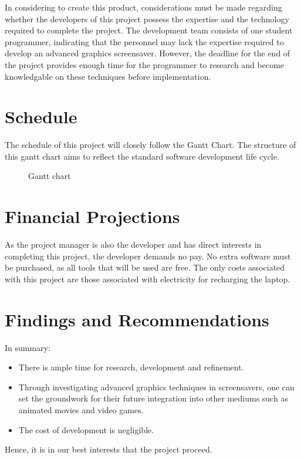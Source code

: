 \documentclass[10pt, openany]{book}
\begin{document}
In considering to create this product, considerations must be made regarding whether the developers of this project possess the expertise and the technology required to complete the project. The development team consists of one student programmer, indicating that the personnel may lack the expertise required to develop an advanced graphics screensaver. However, the deadline for the end of the project provides enough time for the programmer to research and become knowledgable on these techniques before implementation.

\section{Schedule}

The schedule of this project will closely follow the Gantt Chart.
The structure of this gantt chart aims to reflect the standard software development life cycle.

\begin{figure}[H]
	\centering
	\caption{Gantt chart}
	\label{fig:gantt}
\end{figure}	

\section{Financial Projections}

As the project manager is also the developer and has direct interests in completing this project, the developer demands no pay.
No extra software must be purchased, as all tools that will be used are free.
The only costs associated with this project are those associated with electricity for recharging the laptop.

\section{Findings and Recommendations}

In summary:
\begin{itemize}
	\item There is ample time for research, development and refinement.
	\item Through investigating advanced graphics techniques in screensavers, one can set the groundwork for their future integration into other mediums such as animated movies and video games.
	\item The cost of development is negligible.	
\end{itemize}	
Hence, it is in our best interests that the project proceed.

\printglossaries
\end{document}
